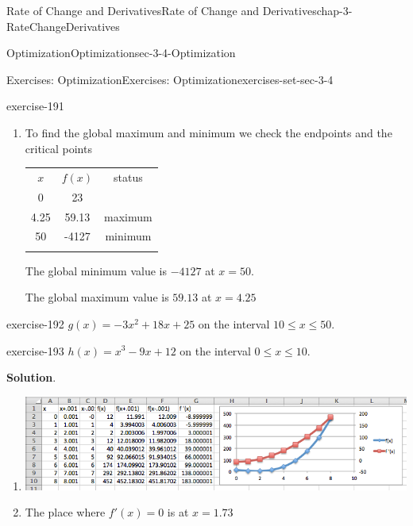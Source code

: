 \documentclass[oneside,10pt,]{book}
\numberwithin{equation}{section}
\newcommand{\hrulethin}  {\noalign{\hrule height 0.04em}}
\newcommand{\hrulethick} {\noalign{\hrule height 0.11em}}
\begin{document}
\begin{chapterptx}{Rate of Change and Derivatives}{}{Rate of Change and Derivatives}{}{}{chap-3-RateChangeDerivatives}
\begin{sectionptx}{Optimization}{}{Optimization}{}{}{sec-3-4-Optimization}
\begin{exercises-subsection-numberless}{Exercises: Optimization}{}{Exercises: Optimization}{}{}{exercises-set-sec-3-4}
\begin{exercisegroup}
\begin{divisionexerciseeg}{1}{}{}{exercise-191}
\begin{enumerate}[label=(\alph*)]
\item\hypertarget{li-395}{}\hypertarget{p-1256}{}%
To find the global maximum and minimum we check the endpoints and the critical points%
\begin{sidebyside}{1}{0}{0}{0}%
\begin{sbspanel}{1}%
{\centering%
\begin{tabular}{ccc}\hrulethick
\(x\)&\(f(x)\)&status\tabularnewline\hrulethin
0&23&\tabularnewline\hrulethin
4.25&59.13&maximum\tabularnewline\hrulethin
50&-4127&minimum\tabularnewline\hrulethin
\end{tabular}
\par}
\end{sbspanel}%
\end{sidebyside}%
\par
\hypertarget{p-1257}{}%
The global minimum value is  \(-4127\) at \(x=50.\)%
\par
\hypertarget{p-1258}{}%
The global maximum value is  \(59.13\) at \(x=4.25\)%
\end{enumerate}
\end{divisionexerciseeg}%
\begin{divisionexerciseeg}{2}{}{}{exercise-192}%
\hypertarget{p-1259}{}%
\(g(x)=-3x^2+18x+25\) on the interval \(10\le x\le 50\).%
\end{divisionexerciseeg}%
\begin{divisionexerciseeg}{3}{}{}{exercise-193}%
\hypertarget{p-1260}{}%
\(h(x)=x^3-9x+12\) on the interval \(0\le x\le 10.\)%
\par\smallskip%
\noindent\textbf{Solution}.\hypertarget{solution-96}{}\quad%
\leavevmode%
\begin{enumerate}[label=(\alph*)]
\item\hypertarget{li-396}{}\leavevmode%
\begin{sidebyside}{1}{0.1}{0.1}{0}%
\begin{sbspanel}{0.8}%
\includegraphics[width=1\linewidth]{images/sec3-4-sol3a.png}
\end{sbspanel}%
\end{sidebyside}%
%
\item\hypertarget{li-397}{}\hypertarget{p-1261}{}%
The place where \(f'(x)=0\) is at \(x = 1.73\)%

\end{enumerate}
\end{divisionexerciseeg}
\end{exercisegroup}
\end{exercises-subsection-numberless}
\end{sectionptx}
\end{chapterptx}
\end{document}
